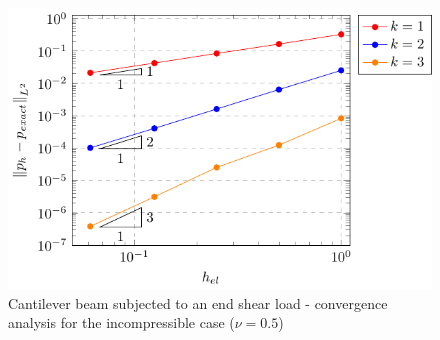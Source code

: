 \documentclass{wccm2024}
\begin{document}
\begin{figure}
     \hfill
    \includegraphics[trim={8.5cm 0cm 0cm 0cm},clip,scale=0.75]{figs/bishop-pres-03.pdf}
    \caption{Cantilever beam subjected to an end shear load - convergence analysis for the incompressible case ($\nu=0.5$)}
    \label{fig:bishop-convergence-nu-05}
\end{figure}
\end{document}
